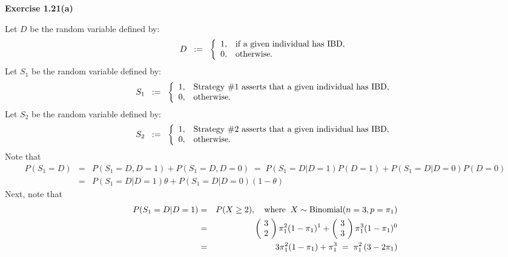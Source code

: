 
\noindent
\textbf{Exercise 1.21(a)}

\vskip 0.5cm
\noindent
Let $D$ be the random variable defined by:
\begin{equation*}
D \;\; := \;\;
\left\{\begin{array}{cl}
1, & \textnormal{if a given individual has IBD}, \\
0, & \textnormal{otherwise}.
\end{array}\right.
\end{equation*}
Let $S_{1}$ be the random variable defined by:
\begin{equation*}
S_{1} \;\; := \;\;
\left\{\begin{array}{cl}
1, & \textnormal{Strategy \#1 asserts that a given individual has IBD}, \\
0, & \textnormal{otherwise}.
\end{array}\right.
\end{equation*}
Let $S_{2}$ be the random variable defined by:
\begin{equation*}
S_{2} \;\; := \;\;
\left\{\begin{array}{cl}
1, & \textnormal{Strategy \#2 asserts that a given individual has IBD}, \\
0, & \textnormal{otherwise}.
\end{array}\right.
\end{equation*}
Note that
\begin{eqnarray*}
P(S_{1} = D)
& = & P(S_{1} = D, D = 1) + P(S_{1} = D, D = 0)
\;=\; P(S_{1} = D \vert D = 1)P(D =1) + P(S_{1} = D \vert D = 0)P(D=0) \\
& = & P(S_{1} = D \vert D = 1)\theta + P(S_{1} = D \vert D = 0)(1 - \theta)
\end{eqnarray*}
Next, note that
\begin{eqnarray*}
P(S_{1} = D \vert D = 1)
& = & P(X \geq 2), \quad\textnormal{where}\;\; X \sim \textnormal{Binomial}(n = 3, p = \pi_{1}) \\
& = &
        \left(\!\begin{array}{c} 3 \\ 2 \end{array}\!\right) \pi_{1}^{2} (1 - \pi_{1})^{1}
      + \left(\!\begin{array}{c} 3 \\ 3 \end{array}\!\right) \pi_{1}^{3} (1 - \pi_{1})^{0}
\\
& = & 3 \pi_{1}^{2} (1 - \pi_{1}) + \pi_{1}^{3}
\;=\; \pi_{1}^{2}\left(3 - 2\pi_{1}\right)
\\
\end{eqnarray*}
